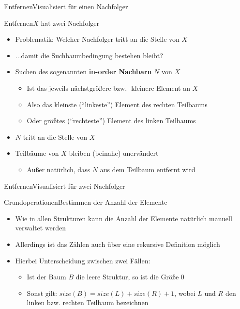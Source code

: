 \begin{frame}{Entfernen}{Visualisiert für einen Nachfolger}
\end{frame}

\begin{frame}{Entfernen}{$X$ hat zwei Nachfolger}
	\begin{itemize}
		\item Problematik: Welcher Nachfolger tritt an die Stelle von $X$
		\item ...damit die Suchbaumbedingung bestehen bleibt?
		\item Suchen des sogenannten \textbf{in-order Nachbarn} $N$ von $X$
		\begin{itemize}
			\item Ist das jeweils nächstgrößere bzw. -kleinere Element an $X$
			\item Also das kleinste ("`linkeste"') Element des rechten Teilbaums
			\item Oder größtes ("`rechteste"') Element des linken Teilbaums
		\end{itemize}
		\item $N$ tritt an die Stelle von $X$
		\item Teilbäume von $X$ bleiben (beinahe) unervändert
		\begin{itemize}
			\item Außer natürlich, dass $N$ aus dem Teilbaum entfernt wird
		\end{itemize}
	\end{itemize}
\end{frame}

\begin{frame}{Entfernen}{Visualisiert für zwei Nachfolger}
\end{frame}

\begin{frame}{Grundoperationen}{Bestimmen der Anzahl der Elemente}
	\begin{itemize}
		\item Wie in allen Strukturen kann die Anzahl der Elemente natürlich manuell verwaltet werden
		\item Allerdings ist das Zählen auch über eine rekursive Definition möglich
		\item Hierbei Unterscheidung zwischen zwei Fällen:
		\begin{itemize}
			\item Ist der Baum $B$ die leere Struktur, so ist die Größe $0$
			\item Sonst gilt: $size(B)=size(L)+size(R)+1$, wobei $L$ und $R$ den linken bzw. rechten Teilbaum bezeichnen
		\end{itemize}
	\end{itemize}
\end{frame}

